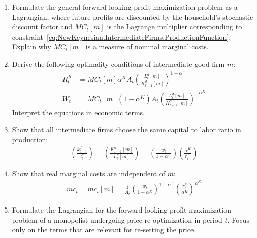\begin{enumerate}[resume]

\item
Formulate the general forward-looking profit maximization problem as a Lagrangian,
  where future profits are discounted by the household's stochastic discount factor
  and \({MC}_{t}[m]\) is the Lagrange multiplier corresponding to constraint~\eqref{eq:NewKeynesian.IntermediateFirms.ProductionFunction}.
Explain why \({MC}_{t}[m]\) is a measure of nominal marginal costs.

\item Derive the following optimality conditions of intermediate good firm \(m\):
\begin{align}
R^{K}_{t}  &= {MC}_{t}[m] \alpha^{K} A_{t} {\left( \frac{L^{d}_{t}[m]}{K^{d}_{t-1}[m]}\right)}^{1-\alpha^{K}}
\label{eq:NewKeynesian.IntermediateFirms.CapitalDemand}
\\
W_{t}  &= {MC}_{t}[m] (1-\alpha^{K}) A_{t} {\left(\frac{L^{d}_{t}[m]}{K^{d}_{t-1}[m]}\right)}^{-\alpha^{K}}
\label{eq:NewKeynesian.IntermediateFirms.LaborDemand}
\end{align}
Interpret the equations in economic terms.

\item
Show that all intermediate firms choose the same capital to labor ratio in production:
\begin{align}
\left(\frac{k^{d}_{t-1}}{l^{d}_{t}}\right) =
\left(\frac{K^{d}_{t-1}[m]}{L^{d}_{t}[m]}\right) =
\left(\frac{w_{t}}{1-\alpha^{K}}\right) \left(\frac{\alpha^{K}}{r^{K}_{t}}\right) \label{eq:NewKeynesian.IntermediateFirms.CapitalLaborRatio}
\end{align}

\item
Show that real marginal costs are independent of \(m\):
\begin{align}
{mc}_{t} = {mc}_{t}[m] = \frac{1}{A_{t}} {\left(\frac{w_{t}}{1-\alpha^{K}}\right)}^{1-\alpha^{K}} {\left(\frac{r^k_{t}}{\alpha^{K}}\right)}^{\alpha^{K}} \label{eq:NewKeynesian.RealMarginalCosts}
\end{align}

\item
Formulate the Lagrangian for the forward-looking profit maximization problem of a monopolist
  undergoing price re-optimization in period \(t\).
Focus only on the terms that are relevant for re-setting the price.


\end{enumerate}
